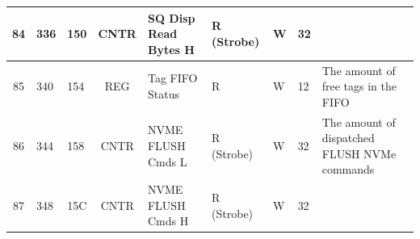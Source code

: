 \begin{landscape}
\begin{longtable}{|c|p{1.1cm}|p{1.1cm}|c|p{5.1cm}|p{1.4cm}|p{1.3cm}|p{1.3cm}|p{6cm}|}
84 & 336 & 150 & CNTR & SQ Disp Read Bytes H & R (Strobe) & W & 32 &  \\ \hline
85 & 340 & 154 & REG & Tag FIFO Status & R & W & 12 & The amount of free tags in the FIFO \\ \hline
86 & 344 & 158 & CNTR & NVME FLUSH Cmds L & R (Strobe) & W & 32 & The amount of dispatched FLUSH NVMe commands \\ \hline
87 & 348 & 15C & CNTR & NVME FLUSH Cmds H & R (Strobe) & W & 32 &  \\ \hline
\end{longtable}
\end{landscape}





